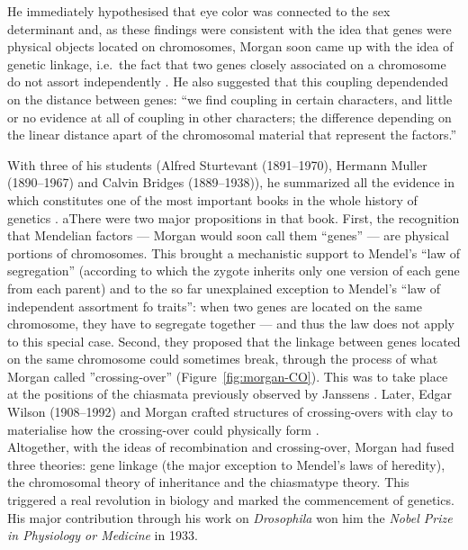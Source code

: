 He immediately hypothesised that eye color was connected to the sex determinant \citep{morgan1910sex} and, as these findings were consistent with the idea that genes were physical objects located on chromosomes, Morgan soon came up with the idea of genetic linkage, i.e.\ the fact that two genes closely associated on a chromosome do not assort independently \citep{morgan1911random}. 
He also suggested that this coupling dependended on the distance between genes: “we find coupling in certain characters, and little or no evidence at all of coupling in other characters; the difference depending on the linear distance apart of the chromosomal material that represent the factors.”

With three of his students (Alfred Sturtevant (1891--1970), Hermann Muller (1890--1967) and Calvin Bridges (1889--1938)), he summarized all the evidence in \textit{} which constitutes one of the most important books in the whole history of genetics \citep{gayon2016mendel}.
aThere were two major propositions in that book. 
First, the recognition that Mendelian factors — Morgan would soon call them “genes” — are physical portions of chromosomes. This brought a mechanistic support to Mendel's “law of segregation” (according to which the zygote inherits only one version of each gene from each parent) and to the so far unexplained exception to Mendel's “law of independent assortment fo traits”: when two genes are located on the same chromosome, they have to segregate together — and thus the law does not apply to this special case. 
Second, they proposed that the linkage between genes located on the same chromosome could sometimes break, through the process of what Morgan called ”crossing-over” (Figure~\ref{fig:morgan-CO}). This was to take place at the positions of the chiasmata previously observed by Janssens \citep{janssens1909theorie}. Later, Edgar Wilson (1908--1992) and Morgan crafted structures of crossing-overs with clay to materialise how the crossing-over could physically form \citep{wilson1920chiasmatype}.\\

Altogether, with the ideas of recombination and crossing-over, Morgan had fused three theories: gene linkage (the major exception to Mendel's laws of heredity), the chromosomal theory of inheritance and the chiasmatype theory. This triggered a real revolution in biology and marked the commencement of genetics. His major contribution through his work on \textit{Drosophila} won him the \textit{Nobel Prize in Physiology or Medicine} in 1933.

